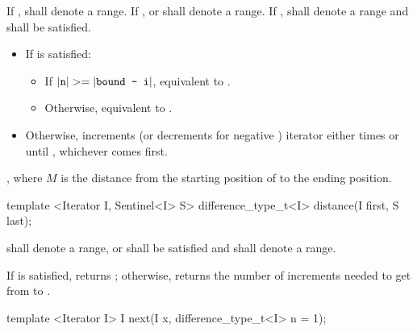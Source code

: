 \begin{itemdescr}
\pnum
\requires
If ,  shall denote a range. If
,  or  shall denote a range. If ,
 shall denote a range and 
shall be satisfied.

\pnum
\effects
\begin{itemize}
\item If  is satisfied:
      \begin{itemize}
      \item If \brk{}$|\texttt{n}| >= |\texttt{bound - i}|$, equivalent to .

      \item Otherwise, equivalent to .
      \end{itemize}

\item Otherwise, increments (or decrements for negative )
      iterator  either  times or until ,
      whichever comes first.
\end{itemize}

\pnum
\returns
{}, where $M$ is the distance from the starting position of
 to the ending position.
\end{itemdescr}

%
\begin{itemdecl}
template <Iterator I, Sentinel<I> S>
  difference_type_t<I> distance(I first, S last);
\end{itemdecl}

\begin{itemdescr}
\pnum
\requires
{} shall denote a range, or  shall be
satisfied and  shall denote a range.

\pnum
\effects
If  is satisfied, returns ; otherwise,
returns the number of increments needed to get from
to
.
\end{itemdescr}

%
\begin{itemdecl}
template <Iterator I>
  I next(I x, difference_type_t<I> n = 1);
\end{itemdecl}

